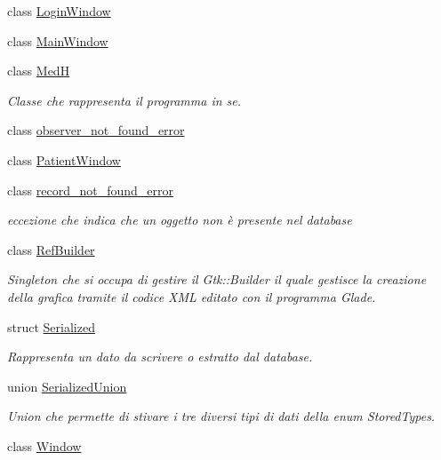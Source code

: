 \begin{DoxyCompactItemize}
class \hyperlink{classmm_1_1_login_window}{Login\+Window}
\item 
class \hyperlink{classmm_1_1_main_window}{Main\+Window}
\item 
class \hyperlink{classmm_1_1_med_h}{MedH}
\begin{DoxyCompactList}\small\item\em Classe che rappresenta il programma in se. \end{DoxyCompactList}\item 
class \hyperlink{classmm_1_1observer__not__found__error}{observer\+\_\+not\+\_\+found\+\_\+error}
\item 
class \hyperlink{classmm_1_1_patient_window}{Patient\+Window}
\item 
class \hyperlink{classmm_1_1record__not__found__error}{record\+\_\+not\+\_\+found\+\_\+error}
\begin{DoxyCompactList}\small\item\em eccezione che indica che un oggetto non è presente nel database \end{DoxyCompactList}\item 
class \hyperlink{classmm_1_1_ref_builder}{Ref\+Builder}
\begin{DoxyCompactList}\small\item\em Singleton che si occupa di gestire il Gtk\+::\+Builder il quale gestisce la creazione della grafica tramite il codice X\+ML editato con il programma Glade. \end{DoxyCompactList}\item 
struct \hyperlink{structmm_1_1_serialized}{Serialized}
\begin{DoxyCompactList}\small\item\em Rappresenta un dato da scrivere o estratto dal database. \end{DoxyCompactList}\item 
union \hyperlink{unionmm_1_1_serialized_union}{Serialized\+Union}
\begin{DoxyCompactList}\small\item\em Union che permette di stivare i tre diversi tipi di dati della enum Stored\+Types. \end{DoxyCompactList}\item 
class \hyperlink{classmm_1_1_window}{Window}
\end{DoxyCompactItemize}
